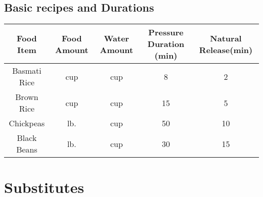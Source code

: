 \documentclass{article}
\begin{document}
\subsection*{Basic recipes and Durations}
\begin{table}[H]
    \centering
    \begin{tabular}{c|c|c|c|c}
        Food Item & Food Amount & Water Amount & Pressure Duration (min) & Natural Release(min) \\ \hline
        Basmati Rice & \unit[1]{cup} & \unit[1]{cup} & 8 & 2\\ \hline
        Brown Rice & \unit[1]{cup} & \unit[1]{cup} & 15 & 5 \\ \hline
        Chickpeas & \unit[1]{lb.} & \unit[6]{cup} & 50 & 10 \\ \hline
        Black Beans & \unit[1]{lb.} & \unit[6]{cup} & 30 & 15 \\
    \end{tabular}
    \label{tab:InstantPot}
\end{table}



\newpage
\section{Substitutes}


\printindex
\end{document}

